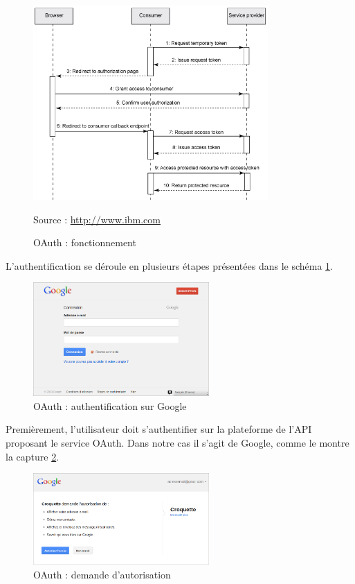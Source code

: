 \begin{figure}[!h]
	\center
	\includegraphics[width=0.8\textwidth]{img/OAuth_fonctionnement.png}
	\caption{OAuth : fonctionnement}
	Source : \href{http://www.ibm.com/developerworks/web/library/wa-oauthsupport/ThreeLeggedOAuthDance.gif}{http://www.ibm.com}
	\label{OAuth_fonctionnement}
\end{figure}

L'authentification se déroule en plusieurs étapes présentées dans le schéma \ref{OAuth_fonctionnement}.
\\


\begin{figure}[!h]
	\center
	\includegraphics[width=0.6\textwidth]{img/OAuth_authentificationGoogle.png}
	\caption{OAuth : authentification sur Google}
	\label{OAuth_authentificationGoogle}
\end{figure}

Premièrement, l'utilisateur doit s'authentifier sur la plateforme de l'API proposant le service OAuth.
Dans notre cas il s'agit de Google, comme le montre la capture \ref{OAuth_authentificationGoogle}.

\begin{figure}[!h]
	\center
	\includegraphics[width=0.6\textwidth]{img/OAuth_demandeAutorisations.png}
	\caption{OAuth : demande d'autorisation}
	\label{OAuth_demandeAutorisations}
\end{figure}

